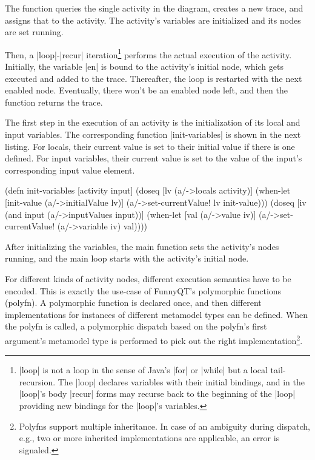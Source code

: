 \documentclass[submission]{eptcs}
\newcommand{\code}{\clojureinline}
\begin{document}
The function queries the single activity in the diagram, creates a new trace,
and assigns that to the activity.  The activity's variables are initialized and
its nodes are set running.

Then, a \code|loop|-\code|recur| iteration\footnote{\code|loop| is not a loop
  in the sense of Java's \code|for| or \code|while| but a local tail-recursion.
  The \code|loop| declares variables with their initial bindings, and in the
  \code|loop|'s body \code|recur| forms may recurse back to the beginning of
  the \code|loop| providing new bindings for the \code|loop|'s variables.}
performs the actual execution of the activity.  Initially, the variable
\code|en| is bound to the activity's initial node, which gets executed and
added to the trace.  Thereafter, the loop is restarted with the next enabled
node.  Eventually, there won't be an enabled node left, and then the function
returns the trace.

The first step in the execution of an activity is the initialization of its
local and input variables.  The corresponding function \code|init-variables| is
shown in the next listing.  For locals, their current value is set to their
initial value if there is one defined.  For input variables, their current
value is set to the value of the input's corresponding input value element.

\begin{clojurecode}
(defn init-variables [activity input]
  (doseq [lv (a/->locals activity)]
    (when-let [init-value (a/->initialValue lv)]
      (a/->set-currentValue! lv init-value)))
  (doseq [iv (and input (a/->inputValues input))]
    (when-let [val (a/->value iv)]
      (a/->set-currentValue! (a/->variable iv) val))))
\end{clojurecode}

After initializing the variables, the main function sets the activity's nodes
running, and the main loop starts with the activity's initial node.

For different kinds of activity nodes, different execution semantics have to be
encoded.  This is exactly the use-case of FunnyQT's polymorphic functions
(polyfn).  A polymorphic function is declared once, and then different
implementations for instances of different metamodel types can be defined.
When the polyfn is called, a polymorphic dispatch based on the polyfn's first
argument's metamodel type is performed to pick out the right
implementation\footnote{Polyfns support multiple inheritance.  In case of an
  ambiguity during dispatch, e.g., two or more inherited implementations are
  applicable, an error is signaled.}.
\end{document}
